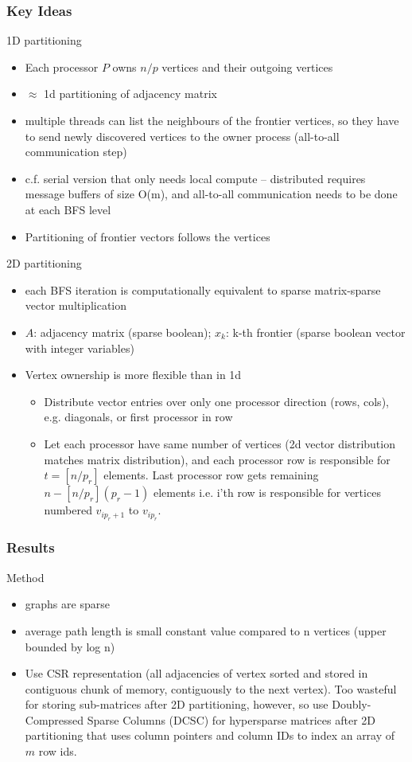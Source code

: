 \subsubsection{Key Ideas}

1D partitioning
\begin{itemize}
    \item Each processor $P$ owns $n/p$ vertices and their outgoing vertices
    \item $\approx$ 1d partitioning of adjacency matrix
    \item multiple threads can list the neighbours of the frontier vertices, so they have to send newly discovered vertices to the owner process (all-to-all communication step)
    \item c.f. serial version that only needs local compute -- distributed requires message buffers of size O(m), and all-to-all communication needs to be done at each BFS level
    \item Partitioning of frontier vectors follows the vertices
\end{itemize}

2D partitioning
\begin{itemize}
    \item each BFS iteration is computationally equivalent to sparse matrix-sparse vector multiplication
    \item $A$: adjacency matrix (sparse boolean); $x_k$: k-th frontier (sparse boolean vector with integer variables)
    \item Vertex ownership is more flexible than in 1d
    \begin{itemize}
        \item Distribute vector entries over only one processor direction (rows, cols), e.g. diagonals, or first processor in row
        \item Let each processor have same number of vertices (2d vector distribution matches matrix distribution), and each processor row is responsible for $t = [n/p_r]$ elements. Last processor row gets remaining $n - [n/p_r](p_r-1)$ elements i.e. i'th row is responsible for vertices numbered $v_{ip_r+1}$ to $v_{ip_r}$.
    \end{itemize}
\end{itemize}

\subsubsection{Results}

Method
\begin{itemize}
    \item graphs are sparse
    \item average path length is small constant value compared to n vertices (upper bounded by log n)
    \item Use CSR representation (all adjacencies of vertex sorted and stored in contiguous chunk of memory, contiguously to the next vertex). Too wasteful for storing sub-matrices after 2D partitioning, however, so use Doubly-Compressed Sparse Columns (DCSC) for hypersparse matrices after 2D partitioning that uses column pointers and column IDs to index an array of $m$ row ids. 
\end{itemize}

